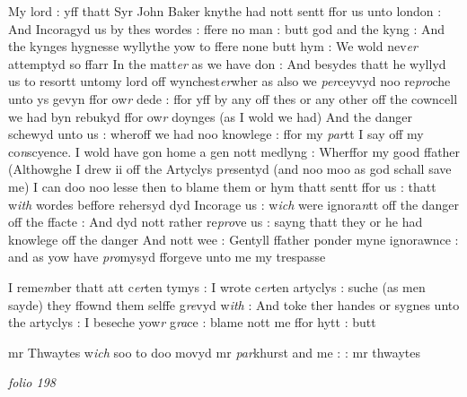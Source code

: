 \documentclass[12pt, a4paper]{book}
\begin{document}
				
					
				\marginpar[\vspace{0.5cm}{\textcolor{Gray}{m}}]{}
			
					
		\ifthenelse{\isodd{\thepage}}
		{\reversemarginpar}
		{\normalmarginpar}
		My lord : yff thatt Syr John Baker knythe had nott sentt ffor us unto london : And Incoragyd us by thes wordes : ffere no man : butt god and the kyng : And the kynges hygnesse wyllythe yow to ffere none butt hym : We wold nev\textit{er} attemptyd so ffarr In the matt\textit{er} as we have don : And besydes thatt he wyllyd us to resortt untomy lord off wynchest\textit{er}wher as also we \textit{per}ceyvyd noo re\textit{pro}che unto ys gevyn ffor ow\textit{r} dede : ffor yff by any off thes or any other off the cowncell we had byn rebukyd ffor ow\textit{r} doynges (as I wold we had) And the danger schewyd unto us : wheroff we had noo knowlege : ffor my \textit{par}tt I say off my co\textit{n}scyence. I wold have gon home a gen nott  medlyng : Wherffor my good ffather (Althowghe I drew ii off the  Artyclys p\textit{re}sentyd (and noo moo as god schall save me) I can doo  noo lesse then to blame them or hym thatt sentt ffor us : thatt w\textit{ith} wordes beffore rehersyd dyd Incorage us : w\textit{ich} were ignora\textit{n}tt off the danger off the ffacte : And dyd nott 
			rather re\textit{pro}ve us : sayng thatt they or he had knowlege off the danger And nott wee : Gentyll ffather ponder myne ignorawnce : and as yow have \textit{pro}mysyd fforgeve unto me my trespasse 
				
      				
      				
				\marginpar[\vspace{0.5cm}{\textcolor{Gray}{mr Twaites}}]{}
			
      				
		\ifthenelse{\isodd{\thepage}}
		{\reversemarginpar}
		{\normalmarginpar}
		I reme\textit{m}ber thatt att c\textit{er}ten tymys : I wrote c\textit{er}ten artyclys : suche (as men sayde) they ffownd them selffe g\textit{re}vyd w\textit{ith} : And toke ther handes or sygnes unto the artyclys : I beseche yow\textit{r} g\textit{ra}ce : blame nott me ffor hytt : butt 

      					mr Thwaytes w\textit{ich} soo to doo movyd mr \textit{par}khurst and me : : mr thwaytes
      				
\dotfill
						\newpage
{}

\textit{folio 198}
      				
      				
      				
\end{document}
